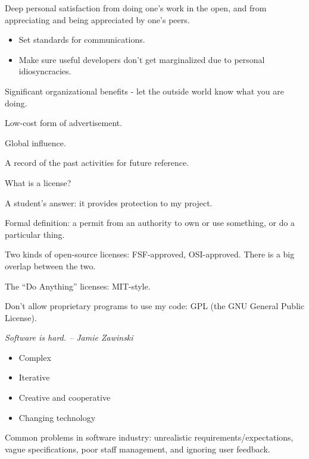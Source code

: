 \documentclass[landscape,30pt]{foils}
\begin{document}
Deep personal satisfaction from doing one's work in the open, and from appreciating and being appreciated by one's peers.

\begin{itemize}
\item Set standards for communications.
\item Make sure useful developers don't get marginalized due to personal idiosyncracies.
\end{itemize}



Significant organizational benefits - let the outside world know what
you are doing.

Low-cost form of advertisement.

Global influence.

A record of the past activities for future reference.


What is a license?

A student's answer: it provides protection to my project.

Formal definition:  a permit from an authority to own or use something, or do a particular thing.

Two kinds of open-source licenses:  FSF-approved, OSI-approved.  There is a big overlap between the two.

The ``Do Anything'' licenses: MIT-style.

Don't allow proprietary programs to use my code: GPL (the GNU General Public License).






{\em Software is hard.  --  Jamie Zawinski}

\begin{itemize}
\item Complex
\item Iterative
\item Creative and cooperative
\item Changing technology
\end{itemize}

Common problems in software industry: unrealistic
requirements/expectations, vague specifications, poor staff
management, and ignoring user feedback.
\end{document}

